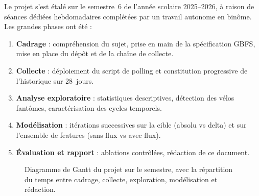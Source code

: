 \documentclass[fleqn, 12pt]{scrartcl}
\begin{document}
Le projet s'est étalé sur le semestre~6 de l'année scolaire 2025--2026, à raison de séances dédiées hebdomadaires complétées par un travail autonome en binôme. Les grandes phases ont été :

\begin{enumerate}
    \item \textbf{Cadrage} : compréhension du sujet, prise en main de la spécification GBFS, mise en place du dépôt et de la chaîne de collecte.
    \item \textbf{Collecte} : déploiement du script de polling et constitution progressive de l'historique sur 28~jours.
    \item \textbf{Analyse exploratoire} : statistiques descriptives, détection des vélos fantômes, caractérisation des cycles temporels.
    \item \textbf{Modélisation} : itérations successives sur la cible (absolu vs delta) et sur l'ensemble de features (sans flux vs avec flux).
    \item \textbf{Évaluation et rapport} : ablations contrôlées, rédaction de ce document.
\end{enumerate}

\begin{figure}[htp]
    \caption{Diagramme de Gantt du projet sur le semestre, avec la répartition du temps entre cadrage, collecte, exploration, modélisation et rédaction.}
    \label{fig:gantt}
\end{figure}
\end{document}
